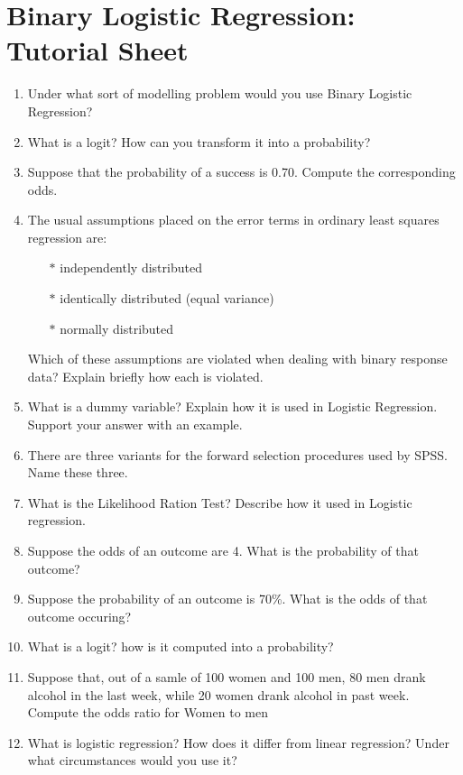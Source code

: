 \documentclass[a4paper,12pt]{article}
\begin{document}
	\section*{Binary Logistic Regression: Tutorial Sheet}
\begin{enumerate}
	
	\item 
Under what sort of modelling problem would you use Binary Logistic Regression?

	\item What is a logit? How can you transform it into a probability?
	\item Suppose that the probability of a success is 0.70. Compute the corresponding odds.
	\item The usual assumptions placed on the error terms in ordinary least squares
	regression are:
	\begin{itemize}
		\item[$\ast$] independently distributed
		\item[$\ast$] identically distributed (equal variance)
		\item[$\ast$] normally distributed
	\end{itemize}
	Which of these assumptions are violated when dealing with binary response
	data? Explain briefly how each is violated.
	\item What is a dummy variable? Explain how it is used in Logistic Regression. Support your answer with an example.
	\item There are three variants for the forward selection procedures used by SPSS. Name these three.
	\item What is the Likelihood Ration Test? Describe how it used in Logistic regression.
	\item Suppose the odds of an outcome are 4. What is the probability of that outcome?
	\item Suppose the probability of an outcome is 70\%. What is the odds of that outcome occuring?
	\item What is a logit? how is it computed into a probability?
	\item Suppose that, out of a samle of 100 women and 100 men, 80 men drank alcohol in the last week, while 20 women drank alcohol in past week. Compute the odds ratio for Women to men
	\item What is logistic regression? How does it differ from linear regression? Under what circumstances would you use it?
\end{enumerate}	
\end{document}
